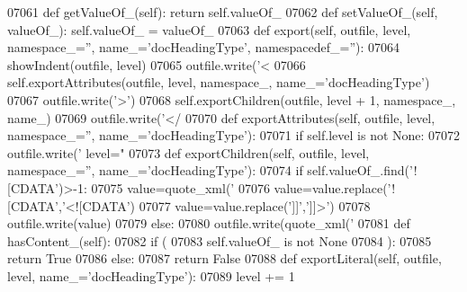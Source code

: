 \begin{DoxyCode}
{{{{{{{{{{{{{{{{{{{{{{{{{{{{{{{{{{{{{{{{{{{{{{{{{{{{{{{{{{{{{{{{{{{{{{{{{{{{{{{{{{{{{{{{{{{{{{{{{{{{{{{{{{{{{{{{{{{{{{{{{{{{{{{{{{{{{{{{{{{{{{{{{{{{{{{{{{{{{{{{{{{{{{{{{{{{{{{{{{{{{{{{{{{{{{{{{{{{{{{{{{{{{{{{{{{{{{{{{{{{{{{{{{{{{{{{{{{{{{{{{{{{{{{{{{{{{{{{{{{{{{{{{{{{{{{{{{{{{{{{{{{{{{{{{{{{{{{{{{{{{{{{{{{{{{{{{{{{{{{{{{{{{{{{{{{{{{{{{{{{{{{{{{{{{{{{{{{{{{{{{{{{{{{{{{{{{{{{{{{{{{{{{{{{{{{{{{{{{{{{{{{{{{{{{{{{{{{{{{{{{{{{{{{{{{{{{07061     \textcolor{keyword}{def }getValueOf_(self): \textcolor{keywordflow}{return} self.valueOf\_
07062     \textcolor{keyword}{def }setValueOf_(self, valueOf\_): self.valueOf\_ = valueOf\_
07063     \textcolor{keyword}{def }export(self, outfile, level, namespace\_='', name\_='docHeadingType', namespacedef\_=''):
07064         showIndent(outfile, level)
07065         outfile.write(\textcolor{stringliteral}{'<%
07066         self.exportAttributes(outfile, level, namespace\_, name\_=\textcolor{stringliteral}{'docHeadingType'})
07067         outfile.write(\textcolor{stringliteral}{'>'})
07068         self.exportChildren(outfile, level + 1, namespace\_, name\_)
07069         outfile.write(\textcolor{stringliteral}{'</%
07070     \textcolor{keyword}{def }exportAttributes(self, outfile, level, namespace\_='', name\_='docHeadingType'):
07071         \textcolor{keywordflow}{if} self.level \textcolor{keywordflow}{is} \textcolor{keywordflow}{not} \textcolor{keywordtype}{None}:
07072             outfile.write(\textcolor{stringliteral}{' level="%
07073     \textcolor{keyword}{def }exportChildren(self, outfile, level, namespace\_='', name\_='docHeadingType'):
07074         \textcolor{keywordflow}{if} self.valueOf\_.find(\textcolor{stringliteral}{'![CDATA'})>-1:
07075             value=quote_xml(\textcolor{stringliteral}{'%
07076             value=value.replace(\textcolor{stringliteral}{'![CDATA'},\textcolor{stringliteral}{'<![CDATA'})
07077             value=value.replace(\textcolor{stringliteral}{']]'},\textcolor{stringliteral}{']]>'})
07078             outfile.write(value)
07079         \textcolor{keywordflow}{else}:
07080             outfile.write(quote_xml(\textcolor{stringliteral}{'%
07081     \textcolor{keyword}{def }hasContent_(self):
07082         \textcolor{keywordflow}{if} (
07083             self.valueOf_ \textcolor{keywordflow}{is} \textcolor{keywordflow}{not} \textcolor{keywordtype}{None}
07084             ):
07085             \textcolor{keywordflow}{return} \textcolor{keyword}{True}
07086         \textcolor{keywordflow}{else}:
07087             \textcolor{keywordflow}{return} \textcolor{keyword}{False}
07088     \textcolor{keyword}{def }exportLiteral(self, outfile, level, name\_='docHeadingType'):
07089         level += 1
}}}}}}}}}}}}}}}}}}}}}}}}}}}}}}}}}}}}}}}}}}}}}}}}}}}}}}}}}}}}}}}}}}}}}}}}}}}}}}}}}}}}}}}}}}}}}}}}}}}}}}}}}}}}}}}}}}}}}}}}}}}}}}}}}}}}}}}}}}}}}}}}}}}}}}}}}}}}}}}}}}}}}}}}}}}}}}}}}}}}}}}}}}}}}}}}}}}}}}}}}}}}}}}}}}}}}}}}}}}}}}}}}}}}}}}}}}}}}}}}}}}}}}}}}}}}}}}}}}}}}}}}}}}}}}}}}}}}}}}}}}}}}}}}}}}}}}}}}}}}}}}}}}}}}}}}}}}}}}}}}}}}}}}}}}}}}}}}}}}}}}}}}}}}}}}}}}}}}}}}}}}}}}}}}}}}}}}}}}}}}}}}}}}}}}}}}}}}}}}}}}}}}}}}}}}}}}}}}}}}}}}}}}}}}}}}}}}}}}
\end{DoxyCode}
